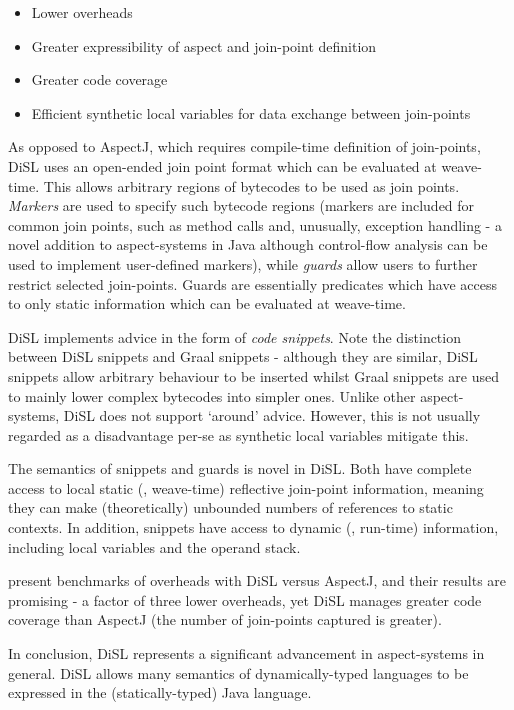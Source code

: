 	\begin{itemize}
		\item Lower overheads
		\item Greater expressibility of aspect and join-point definition
		\item Greater code coverage
		\item Efficient synthetic local variables for data exchange between join-points
	\end{itemize}
	
	As opposed to AspectJ, which requires compile-time definition of join-points, DiSL uses an open-ended join point format which can be evaluated at weave-time. This allows arbitrary regions of bytecodes to be used as join points. \textit{Markers} are used to specify such bytecode regions (markers are included for common join points, such as method calls and, unusually, exception handling - a novel addition to aspect-systems in Java although control-flow analysis can be used to implement user-defined markers), while \textit{guards} allow users to further restrict selected join-points. Guards are essentially predicates which have access to only static information which can be evaluated at weave-time.
	
	DiSL implements advice in the form of \textit{code snippets}. Note the distinction between DiSL snippets and Graal snippets - although they are similar, DiSL snippets allow arbitrary behaviour to be inserted whilst Graal snippets are used to mainly lower complex bytecodes into simpler ones. Unlike other aspect-systems, DiSL does not support `around' advice. However, this is not usually regarded as a disadvantage per-se as synthetic local variables mitigate this.
	
	The semantics of snippets and guards is novel in DiSL. Both have complete access to local static (\ie, weave-time) reflective join-point information, meaning they can make (theoretically) unbounded numbers of references to static contexts. In addition, snippets have access to dynamic (\ie, run-time) information, including local variables and the operand stack.
	
	\citeauthor{Marek2012} present benchmarks of overheads with DiSL versus AspectJ, and their results are promising - a factor of three lower overheads, yet DiSL manages greater code coverage than AspectJ (the number of join-points captured is greater).
	
	In conclusion, DiSL represents a significant advancement in aspect-systems in general. DiSL allows many semantics of dynamically-typed languages to be expressed in the (statically-typed) Java language.
	
